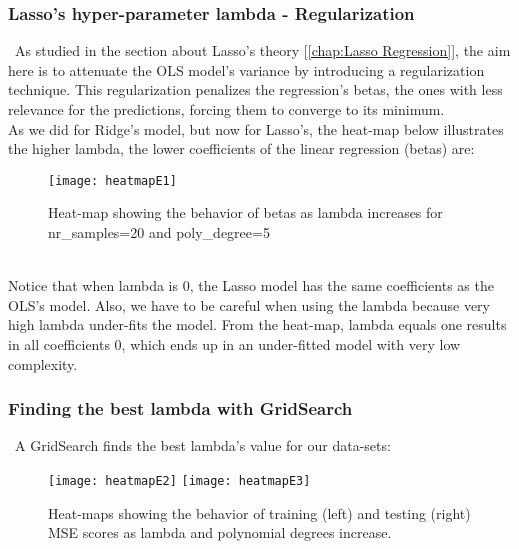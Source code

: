 \subsubsection{Lasso's hyper-parameter lambda - Regularization}
\label{chap:Lasso's hyper-parameter lambda - Regularization}

\quad \, As studied in the section about Lasso's theory [\ref{chap:Lasso Regression}], the aim here is to attenuate the OLS model's variance by introducing a regularization technique. This regularization penalizes the regression's betas, the ones with less relevance for the predictions, forcing them to converge to its minimum.\\

As we did for Ridge's model, but now for Lasso's, the heat-map below illustrates the higher lambda, the lower coefficients of the linear regression (betas) are: \\

\begin{figure}[h]
\label{fig:heatmapE1}
\centering
\texttt{[image: heatmapE1]}
\caption{Heat-map showing the behavior of betas as lambda increases for nr\_samples=20 and poly\_degree=5}
\end{figure}\\

Notice that when lambda is 0, the Lasso model has the same coefficients as the OLS's model. Also, we have to be careful when using the lambda because very high lambda under-fits the model. From the heat-map, lambda equals one results in all coefficients 0, which ends up in an under-fitted model with very low complexity.\\

\subsubsection{Finding the best lambda with GridSearch}
\label{chap:Finding the best lambda with GridSearch}

\quad \, A GridSearch finds the best lambda's value for our data-sets: \\

\begin{figure}[H]
\label{fig:heatmapE2andE3}
\centering
\texttt{[image: heatmapE2]}
\texttt{[image: heatmapE3]}
\caption{Heat-maps showing the behavior of training (left) and testing (right) MSE scores as lambda and polynomial degrees increase.}
\end{figure}\\

